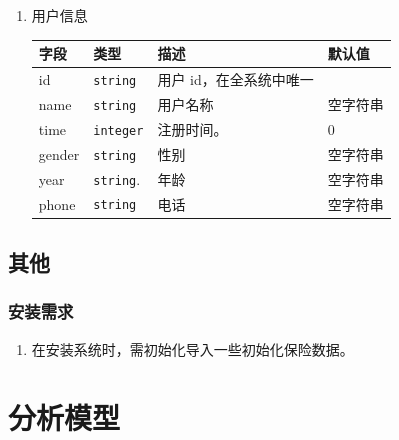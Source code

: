 \documentclass[a4paper]{ctexart}
\begin{document}
\begin{enumerate}[label=DR\arabic*.]
  \item 用户信息
    \begin{center}
      \begin{tabular}{llll}
        \toprule
        字段           & 类型              & 描述                       & 默认值   \\
        \midrule
        id             & \texttt{string}   & 用户 id，在全系统中唯一    &          \\
        name           & \texttt{string}   & 用户名称                   & 空字符串 \\
        time           & \texttt{integer}  & 注册时间。                 & 0        \\
        gender         & \texttt{string}   & 性别                       & 空字符串 \\
        year           & \texttt{string}.  & 年龄                       & 空字符串 \\
        phone          & \texttt{string}   & 电话                       & 空字符串 \\
        \bottomrule
      \end{tabular}
    \end{center}
    
\end{enumerate}

\subsection{其他}

\subsubsection{安装需求}

\begin{enumerate}[label=Install\arabic*.]
  \item 在安装系统时，需初始化导入一些初始化保险数据。
\end{enumerate}

\section{分析模型}
\end{document}
